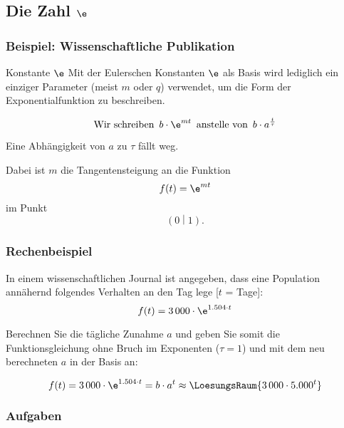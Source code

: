 \subsection{Die Zahl $\e$}


\subsubsection{Beispiel: Wissenschaftliche Publikation}


\begin{bemerkung}{Konstante $\e$}{}
  Mit der Eulerschen Konstanten $\e$ als Basis wird lediglich ein einziger
  Parameter (meist $m$ oder $q$) verwendet, um die Form der
  Exponentialfunktion zu beschreiben.

  $$\text{Wir schreiben }\, b\cdot{}\e^{mt} \,\text{ anstelle von }\, b\cdot{}a^{\frac{t}{\tau}}$$

  Eine Abhängigkeit von $a$ zu $\tau$ fällt weg.

  Dabei ist $m$ die Tangentensteigung an die Funktion $$f(t) = \e^{mt}$$
  im Punkt $$\left(0\middle|1\right).$$
\end{bemerkung}

\subsubsection*{Rechenbeispiel}

In einem wissenschaftlichen Journal ist angegeben, dass eine Population annähernd folgendes Verhalten an den Tag lege [$t$ = Tage]:
$$f(t) = 3\,000\cdot{}\e^{1.504\cdot{}t}$$

Berechnen Sie die tägliche Zunahme $a$ und geben Sie somit die Funktionsgleichung ohne Bruch im Exponenten ($\tau = 1$) und mit dem neu berechneten $a$ in der Basis an:

$$f(t) = 3\,000\cdot{}\e^{1.504\cdot{}t} = b\cdot{}a^t \approx \LoesungsRaum{3\,000\cdot{}5.000^t}$$



\subsubsection*{Aufgaben}
\newpage


